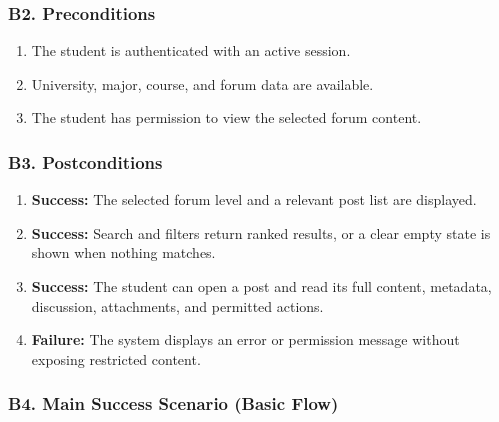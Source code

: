 \documentclass[12pt]{article}
\begin{document}
\hypertarget{sec:b2-preconditions}{}
\subsubsection*{B2. Preconditions}
\par\medskip

\begin{enumerate}
\item The student is authenticated with an active session.
\item University, major, course, and forum data are available.
\item The student has permission to view the selected forum content.
\end{enumerate}
\par\medskip

\hypertarget{sec:b3-postconditions}{}
\subsubsection*{B3. Postconditions}
\par\medskip

\begin{enumerate}
\item \textbf{Success:} The selected forum level and a relevant post list are displayed.
\item \textbf{Success:} Search and filters return ranked results, or a clear empty state is shown when nothing matches.
\item \textbf{Success:} The student can open a post and read its full content, metadata, discussion, attachments, and permitted actions.
\item \textbf{Failure:} The system displays an error or permission message without exposing restricted content.
\end{enumerate}
\par\medskip

\hypertarget{sec:b4-main-success-scenario-basic-flow}{}
\subsubsection*{B4. Main Success Scenario (Basic Flow)}
\par\medskip
\end{document}
